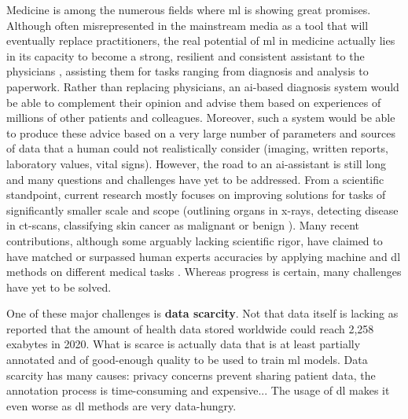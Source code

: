 Medicine is among the numerous fields where \acrlong{ml} is showing great promises. Although often misrepresented in the mainstream media as a tool that will eventually replace practitioners, the real potential of \acrlong{ml} in medicine actually lies in its capacity to become a strong, resilient and consistent assistant to the physicians \parencite{rajkomar2019machine}, assisting them for tasks ranging from diagnosis and analysis to paperwork. Rather than replacing physicians, an \acrshort{ai}-based diagnosis system would be able to complement their opinion and advise them based on experiences of millions of other patients and colleagues. Moreover, such a system would be able to produce these advice based on a very large number of parameters and sources of data that a human could not realistically consider (imaging, written reports, laboratory values, vital signs). However, the road to an \acrshort{ai}-assistant is still long and many questions and challenges have yet to be addressed. From a scientific standpoint, current research mostly focuses on improving solutions for tasks of significantly smaller scale and scope (\eg outlining organs in x-rays, detecting disease in \acrshort{ct}-scans, classifying skin cancer as malignant or benign ). Many recent contributions, although some arguably lacking scientific rigor, have claimed to have matched or surpassed human experts accuracies by applying machine and \acrlong{dl} methods on different medical tasks \parencite{nagendran2020artificial}. Whereas progress is certain, many challenges have yet to be solved. 

One of these major challenges is \textbf{data scarcity}. Not that data itself is lacking as \parencite{pramanik2019healthcare} reported that the amount of health data stored worldwide could reach 2,258 exabytes in 2020. What is scarce is actually data that is at least partially annotated and of good-enough quality to be used to train \acrlong{ml} models. Data scarcity has many causes: privacy concerns prevent sharing patient data, the annotation process is time-consuming and expensive... The usage of \acrlong{dl} makes it even worse as \acrshort{dl} methods are very data-hungry.

